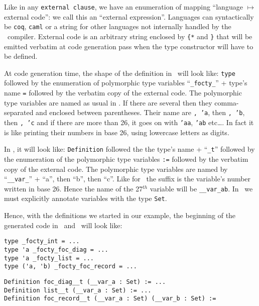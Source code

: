 Like in any {\tt external clause}, we have an enumeration of mapping
``language $\mapsto$ external code'': we call this an ``external
expression''.
Languages can syntactically be
{\tt coq}, {\tt caml} or a string for other languages not internally
handled by the \focalize\ compiler. External code is an arbitrary
string enclosed by {\tt \{*} and {\tt *\}} that will be emitted
verbatim at code generation pass when the type constructor will have
to be defined.

At code generation time, the shape of the definition in \ocaml\ will
look like: {\tt type} followed by the enumeration of polymorphic type
variables ``{\tt \_focty\_}'' + type's name {\tt =} followed by the
verbatim copy of the external code. The polymorphic type variables are
named as usual in \ocaml. If there are several then they
comma-separated and enclosed between parentheses. Their name are
{\tt, 'a}, then {\tt, 'b}, then {\tt, 'c} and if there are more than
26, it goes on with {\tt 'aa}, {\tt 'ab} etc\ldots. In fact it is like
printing their numbers in base 26, using lowercase letters as digits.

In \coq, it will look like: {\tt Definition} followed the the type's
name + ``{\tt \_t}'' followed by the enumeration of the polymorphic
type variables {\tt :=} followed by the verbatim copy of the
external code. The polymorphic type variables are named by
``{\tt \_\_var\_}'' + ``a'', then ``b'', then ``c''. Like for \ocaml\
the suffix is the variable's number written in base 26. Hence the name
of the 27$^{th}$ variable will be {\tt \_\_var\_ab}. In \coq\, we must
explicitly annotate variables with the type {\tt Set}.

Hence, with the definitions we started in our example, the beginning
of the generated code in \ocaml\ and \coq\ will look like:

{\footnotesize
\begin{lstlisting}[language=MyOCaml,
                   title=\ocaml\ code for external definitions]
type _focty_int = ...
type 'a _focty_foc_diag = ...
type 'a _focty_list = ...
type ('a, 'b) _focty_foc_record = ...
\end{lstlisting}
}

{\footnotesize
\begin{lstlisting}[language=MyCoq,
                   title=\coq\ code for external definitions]
Definition foc_diag__t (__var_a : Set) := ...
Definition list__t (__var_a : Set) := ...
Definition foc_record__t (__var_a : Set) (__var_b : Set) :=
\end{lstlisting}
}


